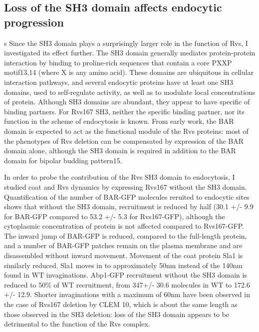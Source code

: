 	\subsection{Loss of the SH3 domain affects endocytic progression}s
Since the SH3 domain plays a surprisingly larger role in the function of Rvs, I investigated its effect further. The SH3 domain generally mediates protein-protein interaction by binding to proline-rich sequences that contain a core PXXP motif13,14 (where X is any amino acid). These domains are ubiquitous in cellular interaction pathways, and several endocytic proteins have at least one SH3 domains, used to self-regulate activity, as well as to modulate local concentrations of protein. Although SH3 domains are abundant, they appear to have specific of binding partners. For Rvs167 SH3, neither the specific binding partner, nor its function in the scheme of endocytosis is known. From early work, the BAR domain is expected to act as the functional module of the Rvs proteins: most of the phenotypes of Rvs deletion can be compensated by expression of the BAR domain alone, although the SH3 domain is required in addition to the BAR domain for bipolar budding pattern15. 

	\vspace{5mm}
In order to probe the contribution of the Rvs SH3 domain to endocytosis, I studied coat and Rvs dynamics by expressing Rvs167 without the SH3 domain. Quantification of the number of BAR-GFP molecules reruited to endocytic sites shows that without the SH3 domain, recruitment is reduced by half (30.1 +/- 9.9 for BAR-GFP compared to 53.2 +/- 5.3 for Rvs167-GFP), although the cytoplasmic concentration of protein is not affected compared to Rvs167-GFP. The inward jump of BAR-GFP is reduced, compared to the full-length protein, and a number of BAR-GFP patches remain on the plasma membrane and are disassembled without inward movement. Movement of the coat protein Sla1 is similarly reduced. Sla1 moves in to approximately 50nm instead of the 140nm found in WT invaginations. Abp1-GFP recruitment without the SH3 domain is reduced to 50\% of WT recruitment, from 347+/- 30.6 molecules in WT to 172.6 +/- 12.9. Shorter invaginations with a maximum of 60nm have been observed in the case of Rvs167 deletion by CLEM 10, which is about the same length as those observed in the SH3 deletion: loss of the SH3 domain appears to be detrimental to the function of the Rvs complex.

